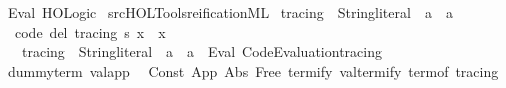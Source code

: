 \begin{isabellebody}
\endisatagproof
{\isafoldproof}%
%
\isadelimproof
\isanewline
%
\endisadelimproof
\isanewline
{}\isamarkupfalse%
\ Eval\ HOLogic%
\isadelimdocument
%
\endisadelimdocument
%
\isatagdocument
%
\isamarkuptrue%
%
\endisatagdocument
{\isafolddocument}%
%
\isadelimdocument
%
\endisadelimdocument
%
\isadelimML
%
\endisadelimML
%
\isatagML
{}\isamarkupfalse%
\ {\isacartoucheopen}{\isachartilde}{\kern0pt}{\isachartilde}{\kern0pt}{\isacharslash}{\kern0pt}src{\isacharslash}{\kern0pt}HOL{\isacharslash}{\kern0pt}Tools{\isacharslash}{\kern0pt}reification{\isachardot}{\kern0pt}ML{\isacartoucheclose}%
\endisatagML
{\isafoldML}%
%
\isadelimML
%
\endisadelimML
%
\isadelimdocument
%
\endisadelimdocument
%
\isatagdocument
%
\isamarkuptrue%
%
\endisatagdocument
{\isafolddocument}%
%
\isadelimdocument
%
\endisadelimdocument
{}\isamarkupfalse%
\ tracing\ {\isacharcolon}{\kern0pt}{\isacharcolon}{\kern0pt}\ {\isachardoublequoteopen}String{\isachardot}{\kern0pt}literal\ {\isasymRightarrow}\ {\isacharprime}{\kern0pt}a\ {\isasymRightarrow}\ {\isacharprime}{\kern0pt}a{\isachardoublequoteclose}\ \isanewline
\ \ {\isacharbrackleft}{\kern0pt}code\ del{\isacharbrackright}{\kern0pt}{\isacharcolon}{\kern0pt}\ {\isachardoublequoteopen}tracing\ s\ x\ {\isacharequal}{\kern0pt}\ x{\isachardoublequoteclose}\isanewline
\isanewline
{}\isamarkupfalse%
\isanewline
\ \ \ {\isachardoublequoteopen}tracing\ {\isacharcolon}{\kern0pt}{\isacharcolon}{\kern0pt}\ String{\isachardot}{\kern0pt}literal\ {\isacharequal}{\kern0pt}{\isachargreater}{\kern0pt}\ {\isacharprime}{\kern0pt}a\ {\isacharequal}{\kern0pt}{\isachargreater}{\kern0pt}\ {\isacharprime}{\kern0pt}a{\isachardoublequoteclose}\ {\isasymrightharpoonup}\ {\isacharparenleft}{\kern0pt}Eval{\isacharparenright}{\kern0pt}\ {\isachardoublequoteopen}Code{\isacharprime}{\kern0pt}{\isacharunderscore}{\kern0pt}Evaluation{\isachardot}{\kern0pt}tracing{\isachardoublequoteclose}\isanewline
\isanewline
\isanewline
{}\isamarkupfalse%
\ dummy{\isacharunderscore}{\kern0pt}term\ valapp\isanewline
{}\isamarkupfalse%
\ {\isacharparenleft}{\kern0pt}\ Const\ App\ Abs\ Free\ termify\ valtermify\ term{\isacharunderscore}{\kern0pt}of\ tracing\isanewline
%
\isadelimtheory
\isanewline
%
\endisadelimtheory
%
\isatagtheory
{}\isamarkupfalse%
%
\endisatagtheory
{\isafoldtheory}%
%
\isadelimtheory
%
\endisadelimtheory
%
\end{isabellebody}%
